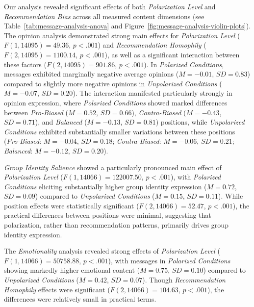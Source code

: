 Our analysis revealed significant effects of both \emph{Polarization Level} and \emph{Recommendation Bias} across all measured content dimensions (see Table~\ref{tab:message-analysis-anova} and Figure~\ref{fig:message-analysis-violin-plots}). The opinion analysis demonstrated strong main effects for \emph{Polarization Level} ($F(1, 14095) = 49.36$, $p < .001$) and \emph{Recommendation Homophily} ($F(2, 14095) = 1100.14$, $p < .001$), as well as a significant interaction between these factors ($F(2, 14095) = 901.86$, $p < .001$). In \emph{Polarized Conditions}, messages exhibited marginally negative average opinions ($M = -0.01$, $SD = 0.83$) compared to slightly more negative opinions in \emph{Unpolarized Conditions} ($M = -0.07$, $SD = 0.20$). The interaction manifested particularly strongly in opinion expression, where \emph{Polarized Conditions} showed marked differences between \emph{Pro-Biased} ($M = 0.52$, $SD = 0.66$), \emph{Contra-Biased} ($M = -0.43$, $SD = 0.71$), and \emph{Balanced} ($M = -0.13$, $SD = 0.81$) positions, while \emph{Unpolarized Conditions} exhibited substantially smaller variations between these positions (\emph{Pro-Biased}: $M = -0.04$, $SD = 0.18$; \emph{Contra-Biased}: $M = -0.06$, $SD = 0.21$; \emph{Balanced}: $M = -0.12$, $SD = 0.20$).

\emph{Group Identity Salience} showed a particularly pronounced main effect of \emph{Polarization Level} ($F(1, 14066) = 122007.50$, $p < .001$), with \emph{Polarized Conditions} eliciting substantially higher group identity expression ($M = 0.72$, $SD = 0.09$) compared to \emph{Unpolarized Conditions} ($M = 0.15$, $SD = 0.11$). While position effects were statistically significant ($F(2, 14066) = 52.47$, $p < .001$), the practical differences between positions were minimal, suggesting that polarization, rather than recommendation patterns, primarily drives group identity expression.






The \emph{Emotionality} analysis revealed strong effects of \emph{Polarization Level} ($F(1, 14066) = 50758.88$, $p < .001$), with messages in \emph{Polarized Conditions} showing markedly higher emotional content ($M = 0.75$, $SD = 0.10$) compared to \emph{Unpolarized Conditions} ($M = 0.42$, $SD = 0.07$). Though \emph{Recommendation Homophily} effects were significant ($F(2, 14066) = 104.63$, $p < .001$), the differences were relatively small in practical terms.

